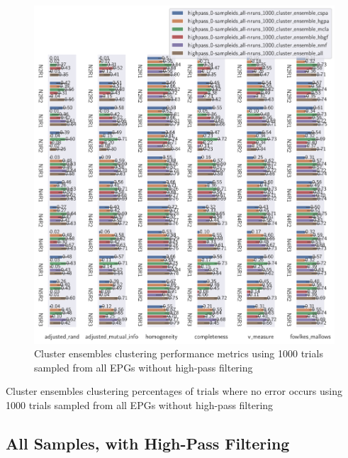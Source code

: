 \begin{theappendices}
\begin{figure}[H]
\centering
\includegraphics[width=\textwidth]{./figures/clust_comparison/highpass_0-sampleids_all-nruns_1000_cluster_ensembles.pdf}
\caption{Cluster ensembles clustering performance metrics using 1000 trials sampled from all EPGs without high-pass filtering}
\label{fig:highpass_0-sampleids_all-nruns_1000_cluster_ensembles}
\end{figure}

\begin{table}[H]
\centering
{}
\caption{Cluster ensembles clustering percentages of trials where no error occurs using 1000 trials sampled from all EPGs without high-pass filtering}
\label{table:highpass_0-sampleids_all-nruns_1000_cluster_ensembles}
\end{table}

\subsection{All Samples, with High-Pass Filtering}


\end{theappendices}
